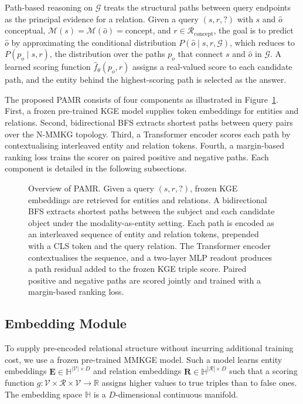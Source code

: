 \documentclass[runningheads]{llncs}
\begin{document}
Path-based reasoning on $\mathcal{G}$ treats the structural paths
between query endpoints as the principal evidence for a relation. Given
a query $(s, r, ?)$ with $s$ and $\hat{o}$ conceptual,
$\mathcal{M}(s) = \mathcal{M}(\hat{o}) = \text{concept}$, and $r \in
\mathcal{R}_{\text{concept}}$, the goal is to predict $\hat{o}$ by
approximating the conditional distribution $P(\hat{o} \mid s, r,
\mathcal{G})$, which reduces to $P(p_o \mid s, r)$, the distribution
over the paths $p_o$ that connect $s$ and $\hat{o}$ in $\mathcal{G}$. A
learned scoring function $\hat{f}_\theta(p_o, r)$ assigns a real-valued
score to each candidate path, and the entity behind the highest-scoring
path is selected as the answer.

The proposed PAMR consists of four components as illustrated in
Figure~\ref{fig:overview}. First, a frozen pre-trained KGE model supplies
token embeddings for entities and relations. Second, bidirectional BFS
extracts shortest paths between query pairs over the N-MMKG topology.
Third, a Transformer encoder scores each path by contextualising
interleaved entity and relation tokens. Fourth, a margin-based ranking
loss trains the scorer on paired positive and negative paths. Each
component is detailed in the following subsections.

\begin{figure}[t]
  \centering
  
  \caption{Overview of PAMR. Given a query $(s, r, ?)$, frozen KGE embeddings are retrieved for entities and relations. A bidirectional BFS extracts shortest paths between the subject and each candidate object under the modality-as-entity setting. Each path is encoded as an interleaved sequence of entity and relation tokens, prepended with a CLS token and the query relation. The Transformer encoder contextualises the sequence, and a two-layer MLP readout produces a path residual added to the frozen KGE triple score. Paired positive and negative paths are scored jointly and trained with a margin-based ranking loss.}
  \label{fig:overview}
\end{figure}

\subsection{Embedding Module}
\label{sec:embedding-module}

To supply pre-encoded relational structure without incurring additional
training cost, we use a frozen pre-trained MMKGE
model.  Such a model
learns entity embeddings $\mathbf{E} \in \mathbb{H}^{|\mathcal{V}| \times D}$
and relation embeddings $\mathbf{R} \in \mathbb{H}^{|\mathcal{R}| \times D}$
such that a scoring function $g: \mathcal{V} \times \mathcal{R} \times
\mathcal{V} \to \mathbb{R}$ assigns higher values to true triples
than to false ones.  The embedding space $\mathbb{H}$ is a
$D$-dimensional continuous manifold.
\end{document}
